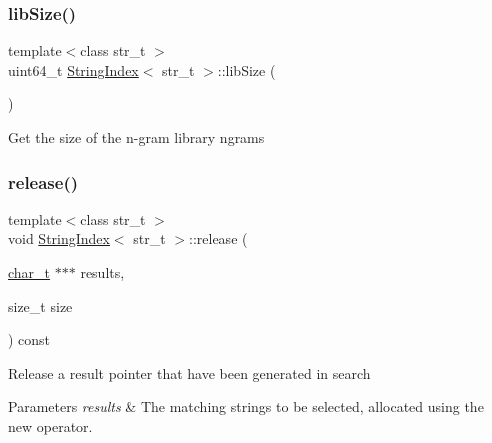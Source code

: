 \subsubsection{\texorpdfstring{lib\+Size()}{libSize()}}
{\footnotesize\ttfamily template$<$class str\+\_\+t $>$ \\
uint64\+\_\+t \mbox{\hyperlink{class_string_index}{String\+Index}}$<$ str\+\_\+t $>$\+::lib\+Size (\begin{DoxyParamCaption}{ }\end{DoxyParamCaption})}

Get the size of the n-\/gram library {\ttfamily ngrams} \mbox{\label{class_string_index_a014f9cc45c6e06aa25b04186c89ec032}} 
\subsubsection{\texorpdfstring{release()}{release()}}
{\footnotesize\ttfamily template$<$class str\+\_\+t $>$ \\
void \mbox{\hyperlink{class_string_index}{String\+Index}}$<$ str\+\_\+t $>$\+::release (\begin{DoxyParamCaption}\item[{\mbox{\hyperlink{class_string_index_a47f131c73d15a7c10c10a9748adf45dc}{char\+\_\+t}} $\ast$$\ast$$\ast$}]{results,  }\item[{size\+\_\+t}]{size }\end{DoxyParamCaption}) const}

Release a result pointer that have been generated in {\ttfamily search} 
\begin{DoxyParams}{Parameters}
{\em results} & The matching strings to be selected, allocated using the {\ttfamily new} operator. \\
\hline
\end{DoxyParams}
\mbox{\label{class_string_index_aa11036396dce714b8c383564ffeaac70}} 
